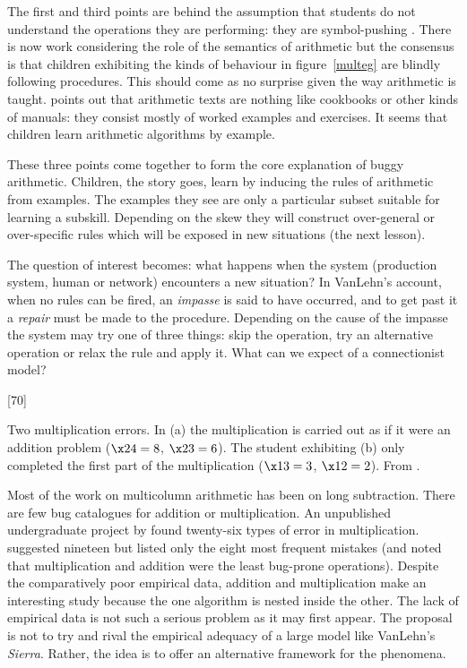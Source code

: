 The first and third points are behind the assumption that students do not
understand the operations they are performing: they are symbol-pushing
\cite[pp.~38--40]{mindbugs}.  There is now work considering the role of the
semantics of arithmetic \cite{hennwhy,paynalge,ohlsfunc} but the consensus
is that children exhibiting the kinds of behaviour in figure~\ref{multeg}
are blindly following procedures.  This should come as no surprise given
the way arithmetic is taught.  points out that
arithmetic texts are nothing like cookbooks or other kinds of manuals: they
consist mostly of worked examples and exercises. It seems that children
learn arithmetic algorithms by example.

These three points come together to form the core explanation of buggy
arithmetic.  Children, the story goes, learn by inducing the rules of
arithmetic from examples.  The examples they see are only a particular
subset suitable for learning a subskill.  Depending on the skew they will
construct over-general or over-specific rules which will be exposed in new
situations (the next lesson).

The question of interest becomes: what happens when the system (production
system, human or network) encounters a new situation?  In VanLehn's
account, when no rules can be fired, an {\em impasse} is said to have
occurred, and to get past it a {\em repair} must be made to the procedure.
Depending on the cause of the impasse the system may try one of three
things: skip the operation, try an alternative operation or relax the rule
and apply it.  What can we expect of a connectionist model?

\begin{fancyfigure}
[70]\vspace{1.5cm}
\caption{Two multiplication errors.  In (a) the multiplication is carried
out as if it were an addition problem ($\x24=8$, $\x23=6$).  The student
exhibiting (b) only completed the first part of the multiplication
($\x13=3$, $\x12=2$). From \protect{}. }
\label{multeg}
\end{fancyfigure}


Most of the work on multicolumn arithmetic has been on long subtraction.
There are few bug catalogues for addition or multiplication. An
unpublished undergraduate project by  found twenty-six types
of error in multiplication.   suggested nineteen but listed
only the eight most frequent mistakes (and noted that multiplication
and addition were the least bug-prone operations).  Despite the
comparatively poor empirical data,  addition and multiplication make an
interesting study because the one algorithm is nested inside the other. The
lack of empirical data is not such a serious problem as it may first
appear.  The proposal is not to try and rival the empirical adequacy of a
large model like VanLehn's {\em Sierra}.  Rather, the idea is to offer an
alternative framework for the phenomena.

